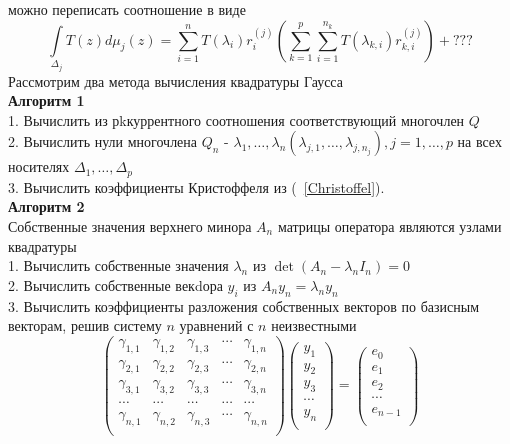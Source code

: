 можно переписать соотношение в виде
\begin{equation}
\label{Quad} \int \limits_{\Delta_j} T(z) d\mu_j(z) =
\sum\limits_{i=1}^{n} {T(\lambda_{i})r_{i}^{(j)}}
 \left( \sum\limits_{k=1}^{p}
\sum\limits_{i=1}^{n_k} {T(\lambda_{k,i})r_{k,i}^{(j)}}\right)+???
\end{equation}
Рассмотрим два метода вычисления квадратуры Гаусса \\
\textbf{Алгоритм 1} \\
1. Вычислить из рkкуррентного соотношения соответствующий
многочлен $Q$ \\
2. Вычислить нули многочлена $Q_n$ -
$\lambda_{1},\ldots,\lambda_{n}(\lambda_{j,1},\ldots,\lambda_{j,n_j}),j=1,\ldots,p$
на всех
носителях $\Delta_1,\ldots,\Delta_p$ \\
3. Вычислить коэффициенты Кристоффеля из (~\ref{Christoffel}).\\
\textbf {Алгоритм 2} \\
Собственные значения верхнего минора $A_n$ матрицы оператора
являются узлами квадратуры \\
1. Вычислить собственные значения $\lambda_n$ из
$\det(A_n-\lambda_nI_n) =0$ \\
2. Вычислить собственные векdора $y_i$ из $A_ny_n=\lambda_ny_n$ \\
3. Вычислить коэффициенты разложения собственных векторов по
базисным векторам, решив систему $n$ уравнений с $n$ неизвестными
\begin{equation}
\left(
\begin{array} {cccccc}
\gamma_{1,1} & \gamma_{1,2} & \gamma_{1,3} & \cdots & \gamma_{1,n} \\
\gamma_{2,1} & \gamma_{2,2} & \gamma_{2,3} & \cdots & \gamma_{2,n} \\
\gamma_{3,1} & \gamma_{3,2} & \gamma_{3,3} & \cdots & \gamma_{3,n} \\
\cdots & \cdots & \cdots & \cdots & \cdots \\
\gamma_{n,1} & \gamma_{n,2} & \gamma_{n,3} & \cdots & \gamma_{n,n} \\
\end{array}
\right) \left(
\begin{array} {cccccc}
y_1 \\
y_2 \\
y_3 \\
\cdots \\
y_n \\
\end{array}
\right)= \left(
\begin{array}{cccccc}
e_0 \\
e_1 \\
e_2 \\
\cdots \\
e_{n-1} \\
\end{array}
\right)
\end{equation}
